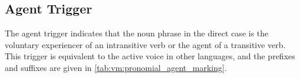 \documentclass[grammar]{subfiles}
\begin{document}
% 
% 
% 

 
\subsection{Agent Trigger}
\label{ssec:vm:agt_trigger}

The agent trigger indicates that the noun phrase in the direct case is the
voluntary experiencer of an intransitive verb or the agent of a transitive
verb.  This trigger is equivalent to the active voice in other languages, and
the prefixes and suffixes are given in \cref{tab:vm:pronomial_agent_marking}.
\end{document}
